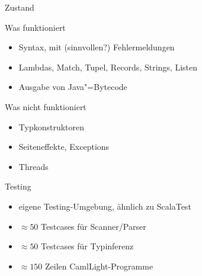 \documentclass[hyperref={pdfpagelabels=false}]{beamer}
\begin{document}
\begin{frame}{Zustand}
  \begin{exampleblock}{Was funktioniert}
    \begin{itemize}
      \item Syntax, mit (sinnvollen?) Fehlermeldungen
      \item Lambdas, Match, Tupel, Records, Strings, Listen
      \item Ausgabe von Java"=Bytecode
    \end{itemize}
  \end{exampleblock}
  \begin{alertblock}{Was nicht funktioniert}
    \begin{itemize}
      \item Typkonstruktoren
      \item Seiteneffekte, Exceptions
      \item Threads
    \end{itemize}
  \end{alertblock}
\end{frame}

\begin{frame}{Testing}
  \begin{itemize}
    \item eigene Testing-Umgebung, ähnlich zu ScalaTest
    \item $\approx 50$ Testcases für Scanner/Parser
    \item $\approx 50$ Testcases für Typinferenz
    \item $\approx 150$ Zeilen CamlLight-Programme
  \end{itemize}
\end{frame}
\end{document}
